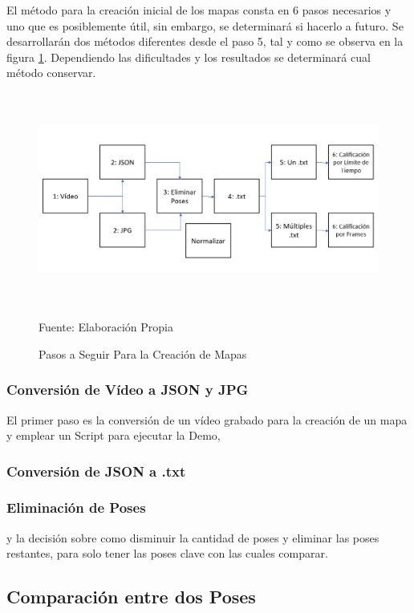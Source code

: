 El método para la creación inicial de los mapas consta en 6 pasos necesarios y uno que es posiblemente útil, sin embargo, se determinará si hacerlo a futuro. Se desarrollarán dos métodos diferentes desde el paso 5, tal y como se observa en la figura \ref{pasosaseguir}. Dependiendo las dificultades y los resultados se determinará cual método conservar.

\begin{figure}[t!]
	\centering
	\includegraphics[width=16cm,height=7cm,]{./Images/pasosaseguir.png}
	\caption{Pasos a Seguir Para la Creación de Mapas}
	\footnotesize Fuente: Elaboración Propia
	\label{pasosaseguir}
\end{figure}




\subsubsection{Conversión de Vídeo a JSON y JPG}

El primer paso es la conversión de un vídeo grabado para la creación de un mapa y emplear un Script para ejecutar la Demo,
\subsubsection{Conversión de JSON a .txt}
\subsubsection{Eliminación de Poses}



 y la decisión sobre como disminuir la cantidad de poses y eliminar las poses restantes, para solo tener las poses clave con las cuales comparar.

\subsection{Comparación entre dos Poses}

